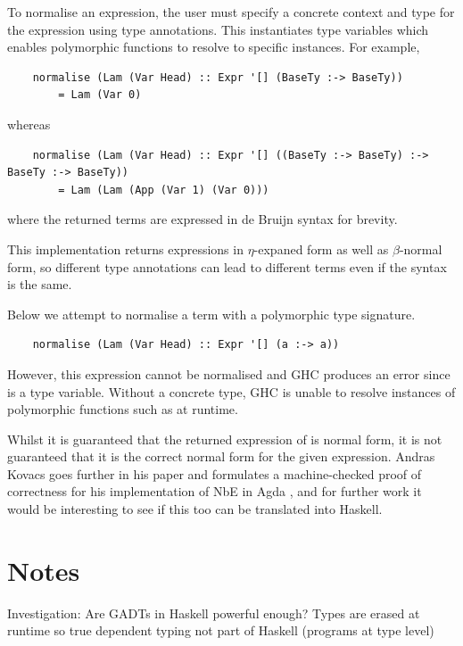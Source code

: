 To normalise an expression, the user must specify a concrete context and type for the expression using type annotations. This instantiates type variables which enables polymorphic functions to resolve to specific instances. For example,

\begin{lstlisting}
    normalise (Lam (Var Head) :: Expr '[] (BaseTy :-> BaseTy)) 
        = Lam (Var 0)
\end{lstlisting}

whereas

\begin{lstlisting}
    normalise (Lam (Var Head) :: Expr '[] ((BaseTy :-> BaseTy) :-> BaseTy :-> BaseTy))
        = Lam (Lam (App (Var 1) (Var 0)))
\end{lstlisting}

where the returned terms are expressed in de Bruijn syntax for brevity.

This implementation returns expressions in $\eta$-expaned form as well as $\beta$-normal form, so different type annotations can lead to different terms even if the syntax is the same. 

Below we attempt to normalise a term with a polymorphic type signature.

\begin{lstlisting}
    normalise (Lam (Var Head) :: Expr '[] (a :-> a))
\end{lstlisting}

However, this expression cannot be normalised and GHC produces an error since  is a type variable. Without a concrete type, GHC is unable to resolve instances of polymorphic functions such as  at runtime.

Whilst it is guaranteed that the returned expression of  is normal form, it is not guaranteed that it is the correct normal form for the given expression. Andras Kovacs goes further in his paper and formulates a machine-checked proof of correctness for his implementation of NbE in Agda \cite{AgdaNbe}, and for further work it would be interesting to see if this too can be translated into Haskell.


\section{Notes}

Investigation: Are GADTs in Haskell powerful enough? Types are erased at runtime so true dependent typing not part of Haskell (programs at type level)


